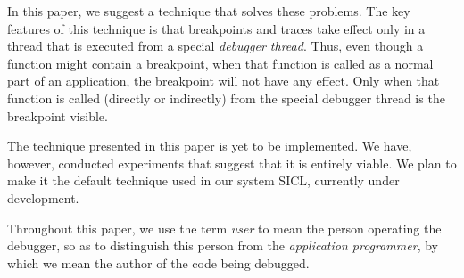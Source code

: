 In this paper, we suggest a technique that solves these problems.  The
key features of this technique is that breakpoints and traces take
effect only in a thread that is executed from a special \emph{debugger
  thread}.  Thus, even though a function might contain a breakpoint,
when that function is called as a normal part of an application, the
breakpoint will not have any effect.  Only when that function is
called (directly or indirectly) from the special debugger thread is
the breakpoint visible.

The technique presented in this paper is yet to be implemented.  We
have, however, conducted experiments that suggest that it is entirely
viable.  We plan to make it the default technique used in our system
SICL, currently under development.

Throughout this paper, we use the term \emph{user} to mean the person
operating the debugger, so as to distinguish this person from the
\emph{application programmer}, by which we mean the author of the code
being debugged.
